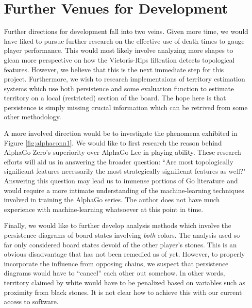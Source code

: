 \documentclass[11pt]{article}
\begin{document}
\section{Further Venues for Development}

Further directions for development fall into two veins. Given more time, we would have liked to pursue further research on the effective use of death times to gauge player performance. This would most likely involve analyzing more shapes to glean more perspective on how the Vietoris-Rips filtration detects topological features. However, we believe that this is the next immediate step for this project. Furthermore, we wish to research implementaions of territory estimation systems which use both persistence and some evaluation function to estimate territory on a local (restricted) section of the board. The hope here is that persistence is simply missing crucial information which can be retrived from some other methodology.

A more involved direction would be to investigate the phenomena exhibited in Figure \ref{fig:alphaconn1}. We would like to first research the reason behind AlphaGo Zero's superiority over AlphaGo Lee in playing ability. These research efforts will aid us in answering the broader question: ``Are most topologically significant features necessarily the most strategically significant features as well?" Answering this question may lead us to immense portions of Go literature and would require a more intimate understanding of the machine-learning techniques involved in training the AlphaGo series. The author does not have much experience with machine-learning whatsoever at this point in time.

Finally, we would like to further develop analysis methods which involve the persistence diagrams of board states involving \textit{both} colors. The analysis used so far only considered board states devoid of the other player's stones. This is an obvious disadvantage that has not been remedied as of yet. However, to properly incorporate the influence from opposing chains, we suspect that persistence diagrams would have to ``cancel'' each other out somehow. In other words, territory claimed by white would have to be penalized based on variables such as proximity from black stones. It is not clear how to achieve this with our current access to software.
\end{document}
